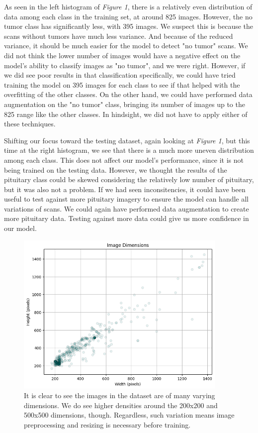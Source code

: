 \documentclass[conference]{IEEEtran}
\begin{document}
As seen in the left histogram of \textit{Figure 1}, there is a relatively even distribution of data among each class in the training set, at around 825 images. However, the no tumor class has significantly less, with 395 images. We suspect this is because the scans without tumors have much less variance. And because of the reduced variance, it should be much easier for the model to detect "no tumor" scans. We did not think the lower number of images would have a negative effect on the model's ability to classify images as "no tumor", and we were right. However, if we did see poor results in that classification specifically, we could have tried training the model on 395 images for each class to see if that helped with the overfitting of the other classes. On the other hand, we could have performed data augmentation on the "no tumor" class, bringing its number of images up to the 825 range like the other classes. In hindsight, we did not have to apply either of these techniques.

Shifting our focus toward the testing dataset, again looking at \textit{Figure 1}, but this time at the right histogram, we see that there is a much more uneven distribution among each class. This does not affect our model's performance, since it is not being trained on the testing data. However, we thought the results of the pituitary class could be skewed considering the relatively low number of pituitary, but it was also not a problem. If we had seen inconsitencies, it could have been useful to test against more pituitary imagery to ensure the model can handle all variations of scans. We could again have performed data augmentation to create more pituitary data. Testing against more data could give us more confidence in our model.

\begin{figure}[!ht]
    \centering
    \includegraphics[width=4in]{ImageDimensions.png}
    \caption{\large It is clear to see the images in the dataset are of many varying dimensions. We do see higher densities around the 200x200 and 500x500 dimensions, though. Regardless, such variation means image preprocessing and resizing is necessary before training.}
    \label{Dimensions of images in the dataset}
\end{figure}
\end{document}
